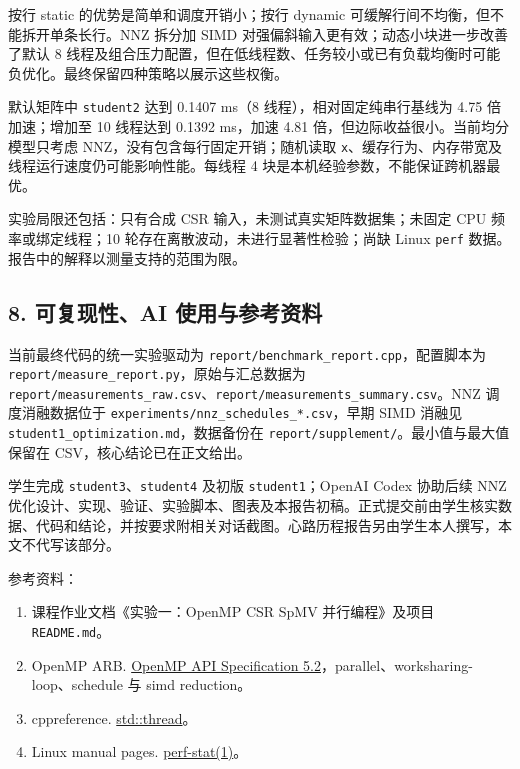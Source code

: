\documentclass[
  10pt,
  a4paper,
]{article}
\providecommand{\tightlist}{%
  \setlength{\itemsep}{0pt}\setlength{\parskip}{0pt}}
\begin{document}
按行 static 的优势是简单和调度开销小；按行 dynamic
可缓解行间不均衡，但不能拆开单条长行。NNZ 拆分加 SIMD
对强偏斜输入更有效；动态小块进一步改善了默认 8
线程及组合压力配置，但在低线程数、任务较小或已有负载均衡时可能负优化。最终保留四种策略以展示这些权衡。

默认矩阵中 \texttt{student2} 达到 0.1407 ms（8
线程），相对固定纯串行基线为 4.75 倍加速；增加至 10 线程达到 0.1392
ms，加速 4.81 倍，但边际收益很小。当前均分模型只考虑
NNZ，没有包含每行固定开销；随机读取
\texttt{x}、缓存行为、内存带宽及线程运行速度仍可能影响性能。每线程 4
块是本机经验参数，不能保证跨机器最优。

实验局限还包括：只有合成 CSR 输入，未测试真实矩阵数据集；未固定 CPU
频率或绑定线程；10 轮存在离散波动，未进行显著性检验；尚缺 Linux
\texttt{perf} 数据。报告中的解释以测量支持的范围为限。

\subsection{8. 可复现性、AI
使用与参考资料}\label{ux53efux590dux73b0ux6027ai-ux4f7fux7528ux4e0eux53c2ux8003ux8d44ux6599}

当前最终代码的统一实验驱动为
\texttt{report/benchmark\_report.cpp}，配置脚本为
\texttt{report/measure\_report.py}，原始与汇总数据为
\texttt{report/measurements\_raw.csv}、\texttt{report/measurements\_summary.csv}。NNZ
调度消融数据位于 \texttt{experiments/nnz\_schedules\_*.csv}，早期 SIMD
消融见 \texttt{student1\_optimization.md}，数据备份在
\texttt{report/supplement/}。最小值与最大值保留在
CSV，核心结论已在正文给出。

学生完成 \texttt{student3}、\texttt{student4} 及初版
\texttt{student1}；OpenAI Codex 协助后续 NNZ
优化设计、实现、验证、实验脚本、图表及本报告初稿。正式提交前由学生核实数据、代码和结论，并按要求附相关对话截图。心路历程报告另由学生本人撰写，本文不代写该部分。

参考资料：

\begin{enumerate}
\def\labelenumi{\arabic{enumi}.}
\tightlist
\item
  课程作业文档《实验一：OpenMP CSR SpMV 并行编程》及项目
  \texttt{README.md}。
\item
  OpenMP ARB.
  \href{https://www.openmp.org/wp-content/uploads/OpenMP-API-Specification-5-2.pdf}{OpenMP
  API Specification 5.2}，parallel、worksharing-loop、schedule 与 simd
  reduction。
\item
  cppreference.
  \href{https://en.cppreference.com/w/cpp/thread/thread.html}{std::thread}。
\item
  Linux manual pages.
  \href{https://man7.org/linux/man-pages/man1/perf-stat.1.html}{perf-stat(1)}。
\end{enumerate}
\end{document}
